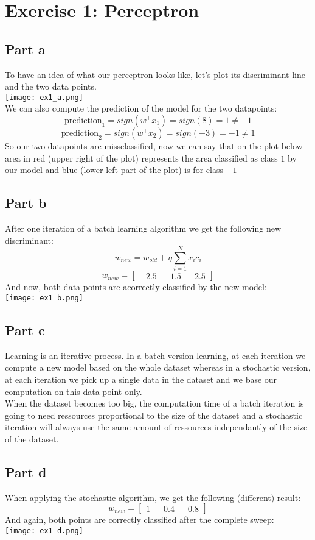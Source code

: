 \section{Exercise 1: Perceptron}
\subsection{Part a}
To have an idea of what our perceptron looks like, let's plot its discriminant line
and the two data points.
\\
\texttt{[image: ex1\_a.png]}
\\
We can also compute the prediction of the model for the two datapoints:
$$
\text{prediction}_1 = sign(w^\top x_1) = sign(8) = 1 \ne -1
$$
$$
\text{prediction}_2 = sign(w^\top x_2) = sign(-3) = -1 \ne 1
$$
So our two datapoints are missclassified, now we can say that on the plot below 
area in red (upper right of the plot) represents the area classified as class $1$ by our model and
blue (lower left part of the plot) is for class $-1$

\subsection{Part b}
After one iteration of a batch learning algorithm we get the following new discriminant:
$$
w_{new} = w_{old} + \eta\sum_{i=1}^N x_ic_i
$$
$$
w_{new} = \begin{bmatrix}-2.5 & -1.5 & -2.5\end{bmatrix}
$$
And now, both data points are acorrectly classified by the new model:
\\
\texttt{[image: ex1\_b.png]}

\subsection{Part c}
Learning is an iterative process. In a batch version learning, at each iteration we compute a new model
based on the whole dataset whereas in a stochastic version, at each iteration we pick up a single data in the dataset
and we base our computation on this data point only.
\\
When the dataset becomes too big, the computation time of a batch iteration is going to need ressources 
proportional to the size of the dataset and a stochastic iteration will always use the same amount of ressources
independantly of the size of the dataset.

\subsection{Part d}
When applying the stochastic algorithm, we get the following (different) result:
$$
w_{new} = \begin{bmatrix}1 & -0.4 & -0.8\end{bmatrix}
$$
And again, both points are correctly classified after the complete sweep:
\\
\texttt{[image: ex1\_d.png]}


